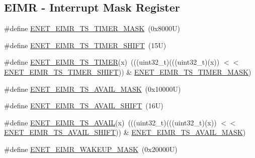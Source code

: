 \subsection*{E\+I\+MR -\/ Interrupt Mask Register}
\begin{DoxyCompactItemize}
\item 
\#define \mbox{\hyperlink{group___e_n_e_t___register___masks_gaf036db440c529ff6fefcb0117db93840}{E\+N\+E\+T\+\_\+\+E\+I\+M\+R\+\_\+\+T\+S\+\_\+\+T\+I\+M\+E\+R\+\_\+\+M\+A\+SK}}~(0x8000\+U)
\item 
\#define \mbox{\hyperlink{group___e_n_e_t___register___masks_ga3ae1d93529feddafe084f0c4709758b1}{E\+N\+E\+T\+\_\+\+E\+I\+M\+R\+\_\+\+T\+S\+\_\+\+T\+I\+M\+E\+R\+\_\+\+S\+H\+I\+FT}}~(15\+U)
\item 
\#define \mbox{\hyperlink{group___e_n_e_t___register___masks_gab19d4f6d5397cbc827da4607deefc3dc}{E\+N\+E\+T\+\_\+\+E\+I\+M\+R\+\_\+\+T\+S\+\_\+\+T\+I\+M\+ER}}(x)~(((uint32\+\_\+t)(((uint32\+\_\+t)(x)) $<$$<$ \mbox{\hyperlink{group___e_n_e_t___register___masks_ga3ae1d93529feddafe084f0c4709758b1}{E\+N\+E\+T\+\_\+\+E\+I\+M\+R\+\_\+\+T\+S\+\_\+\+T\+I\+M\+E\+R\+\_\+\+S\+H\+I\+FT}})) \& \mbox{\hyperlink{group___e_n_e_t___register___masks_gaf036db440c529ff6fefcb0117db93840}{E\+N\+E\+T\+\_\+\+E\+I\+M\+R\+\_\+\+T\+S\+\_\+\+T\+I\+M\+E\+R\+\_\+\+M\+A\+SK}})
\item 
\#define \mbox{\hyperlink{group___e_n_e_t___register___masks_gadb2e7c3e600fe3ea3694c9ebf8460f93}{E\+N\+E\+T\+\_\+\+E\+I\+M\+R\+\_\+\+T\+S\+\_\+\+A\+V\+A\+I\+L\+\_\+\+M\+A\+SK}}~(0x10000\+U)
\item 
\#define \mbox{\hyperlink{group___e_n_e_t___register___masks_ga7af0adce91f65d4127770cbea42a00e7}{E\+N\+E\+T\+\_\+\+E\+I\+M\+R\+\_\+\+T\+S\+\_\+\+A\+V\+A\+I\+L\+\_\+\+S\+H\+I\+FT}}~(16\+U)
\item 
\#define \mbox{\hyperlink{group___e_n_e_t___register___masks_gad58979822995fca6b0d74bff9403130c}{E\+N\+E\+T\+\_\+\+E\+I\+M\+R\+\_\+\+T\+S\+\_\+\+A\+V\+A\+IL}}(x)~(((uint32\+\_\+t)(((uint32\+\_\+t)(x)) $<$$<$ \mbox{\hyperlink{group___e_n_e_t___register___masks_ga7af0adce91f65d4127770cbea42a00e7}{E\+N\+E\+T\+\_\+\+E\+I\+M\+R\+\_\+\+T\+S\+\_\+\+A\+V\+A\+I\+L\+\_\+\+S\+H\+I\+FT}})) \& \mbox{\hyperlink{group___e_n_e_t___register___masks_gadb2e7c3e600fe3ea3694c9ebf8460f93}{E\+N\+E\+T\+\_\+\+E\+I\+M\+R\+\_\+\+T\+S\+\_\+\+A\+V\+A\+I\+L\+\_\+\+M\+A\+SK}})
\item 
\#define \mbox{\hyperlink{group___e_n_e_t___register___masks_ga5a8c25f893ae181e80d0be797b4629f3}{E\+N\+E\+T\+\_\+\+E\+I\+M\+R\+\_\+\+W\+A\+K\+E\+U\+P\+\_\+\+M\+A\+SK}}~(0x20000\+U)

\end{DoxyCompactItemize}
